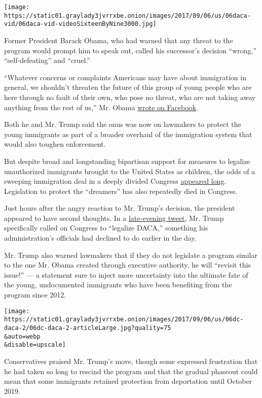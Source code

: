 \texttt{[image: https://static01.graylady3jvrrxbe.onion/images/2017/09/06/us/06daca-vid/06daca-vid-videoSixteenByNine3000.jpg]}

Former President Barack Obama, who had warned that any threat to the
program would prompt him to speak out, called his successor's decision
``wrong,'' ``self-defeating'' and ``cruel.''

``Whatever concerns or complaints Americans may have about immigration
in general, we shouldn't threaten the future of this group of young
people who are here through no fault of their own, who pose no threat,
who are not taking away anything from the rest of us,'' Mr. Obama
\href{https://www.facebookcorewwwi.onion/barackobama/posts/10155227588436749}{wrote
on Facebook}.

Both he and Mr. Trump said the onus was now on lawmakers to protect the
young immigrants as part of a broader overhaul of the immigration system
that would also toughen enforcement.

But despite broad and longstanding bipartisan support for measures to
legalize unauthorized immigrants brought to the United States as
children, the odds of a sweeping immigration deal in a deeply divided
Congress
\href{https://www.nytimes3xbfgragh.onion/2017/09/05/us/politics/dream-act-daca-trump-congress-dreamers.html}{appeared
long}. Legislation to protect the ``dreamers'' has also repeatedly died
in Congress.

Just hours after the angry reaction to Mr. Trump's decision, the
president appeared to have second thoughts. In a
\href{https://twitter.com/realDonaldTrump/status/905228667336499200}{late-evening
tweet}, Mr. Trump specifically called on Congress to ``legalize DACA,''
something his administration's officials had declined to do earlier in
the day.

Mr. Trump also warned lawmakers that if they do not legislate a program
similar to the one Mr. Obama created through executive authority, he
will ``revisit this issue!'' --- a statement sure to inject more
uncertainty into the ultimate fate of the young, undocumented immigrants
who have been benefiting from the program since 2012.

\texttt{[image: https://static01.graylady3jvrrxbe.onion/images/2017/09/06/us/06dc-daca-2/06dc-daca-2-articleLarge.jpg?quality=75\\\&auto=webp\\\&disable=upscale]}

Conservatives praised Mr. Trump's move, though some expressed
frustration that he had taken so long to rescind the program and that
the gradual phaseout could mean that some immigrants retained protection
from deportation until October 2019.


